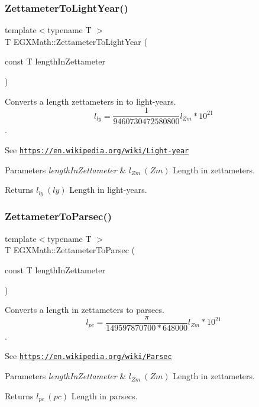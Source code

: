 \subsubsection{\texorpdfstring{Zettameter\+To\+Light\+Year()}{ZettameterToLightYear()}}
{\footnotesize\ttfamily template$<$typename T $>$ \\
T E\+G\+X\+Math\+::\+Zettameter\+To\+Light\+Year (\begin{DoxyParamCaption}\item[{const T}]{length\+In\+Zettameter }\end{DoxyParamCaption})}



Converts a length zettameters in to light-\/years. \[ l_{ly}= \frac{1}{9460730472580800} l_{Zm} * 10^{21} \]. 

See \href{https://en.wikipedia.org/wiki/Light-year}{\tt https\+://en.\+wikipedia.\+org/wiki/\+Light-\/year} 
\begin{DoxyParams}{Parameters}
{\em length\+In\+Zettameter} & $ l_{Zm}\ (Zm)$ Length in zettameters. \\
\hline
\end{DoxyParams}
\begin{DoxyReturn}{Returns}
$ l_{ly}\ (ly)$ Length in light-\/years. 
\end{DoxyReturn}
\mbox{\label{group___e_g_x_math-_conversions-_length_conversions-_zettameter-_astronomical_ga7924b0bc32c99624e84dcfb09806f730}} 
\subsubsection{\texorpdfstring{Zettameter\+To\+Parsec()}{ZettameterToParsec()}}
{\footnotesize\ttfamily template$<$typename T $>$ \\
T E\+G\+X\+Math\+::\+Zettameter\+To\+Parsec (\begin{DoxyParamCaption}\item[{const T}]{length\+In\+Zettameter }\end{DoxyParamCaption})}



Converts a length in zettameters to parsecs. \[ l_{pc}=\frac{\pi}{149597870700 * 648000} l_{Zm} * 10^{21} \]. 

See \href{https://en.wikipedia.org/wiki/Parsec}{\tt https\+://en.\+wikipedia.\+org/wiki/\+Parsec} 
\begin{DoxyParams}{Parameters}
{\em length\+In\+Zettameter} & $ l_{Zm}\ (Zm)$ Length in zettameters. \\
\hline
\end{DoxyParams}
\begin{DoxyReturn}{Returns}
$ l_{pc}\ (pc)$ Length in parsecs. 
\end{DoxyReturn}

